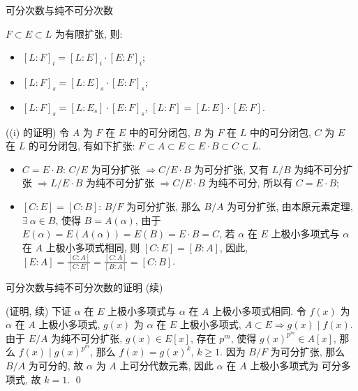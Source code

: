 \begin{frame}{可分次数与纯不可分次数}

\begin{lem}[可分次数与纯不可分次数]
$F \subset E \subset L$ 为有限扩张, 则:
\begin{itemize}
\item[(i)] $[L:F]_i = [L:E]_i \cdot [E:F]_i$;
\item[(ii)] $[L:F]_s = [L:E]_s \cdot [E:F]_s$;
\item[(iii)] $[L:F]_s = [L:E_s] \cdot [E:F]_s$,\quad
  $[L:F] = [L:E] \cdot [E:F]$.
\end{itemize}
\end{lem}

\startproof[bg=yellow, fg=red]((i) 的证明)
令 $A$ 为 $F$ 在 $E$ 中的可分闭包, $B$ 为 $F$ 在 $L$ 中的可分闭包,
$C$ 为 $E$ 在 $L$ 的可分闭包, 有如下扩张: $F \subset A \subset E \subset E \cdot B
\subset C \subset L$.
\begin{itemize}
\item {} $C = E \cdot B$:
  $C/E$ 为可分扩张 $\Longrightarrow C/E \cdot B$ 为可分扩张,
  又有 $L/B$ 为纯不可分扩张 $\Longrightarrow L/E \cdot B$ 为纯不可分扩张
  $\Longrightarrow C/E \cdot B$ 为纯不可分,
  所以有 $C = E \cdot B$;
\item {} $[C:E] = [C:B]$:
  $B/F$ 为可分扩张, 那么 $B/A$ 为可分扩张, 由本原元素定理,
  $\exists\ \alpha \in B$, 使得 $B = A(\alpha)$,
  由于 $E(\alpha) = E(A(\alpha)) = E(B) = E \cdot B = C$,
  若 $\alpha$ 在 $E$ 上极小多项式与 $\alpha$ 在 $A$ 上极小多项式相同,
  则 $[C:E] = [B:A]$,
  因此, $[E:A] = \frac{[C:A]}{[C:E]} = \frac{[C:A]}{[B:A]} = [C:B]$.
\end{itemize}

\end{frame}


\begin{frame}{可分次数与纯不可分次数的证明 (续)}

\startproof[bg=yellow, fg=red](证明, 续)
下证 $\alpha$ 在 $E$ 上极小多项式与 $\alpha$ 在 $A$ 上极小多项式相同.
令 $f(x)$ 为 $\alpha$ 在 $A$ 上极小多项式, $g(x)$ 为 $\alpha$ 在 $E$
上极小多项式,
$A \subset E \Longrightarrow g(x) \mid f(x)$.
由于 $E/A$ 为纯不可分扩张, $g(x) \in E[x]$, 存在 $p^m$, 使得
$g(x)^{p^m} \in A[x]$,
那么 $f(x) \mid g(x)^{p^m}$, 那么 $f(x) = g(x)^k$, $k \geq 1$.
因为 $B/F$ 为可分扩张, 那么 $B/A$ 为可分的,
故 $\alpha$ 为 $A$ 上可分代数元素, 因此 $\alpha$ 在 $A$ 上极小多项式为
可分多项式, 故 $k = 1$.
\qed

\end{frame}

